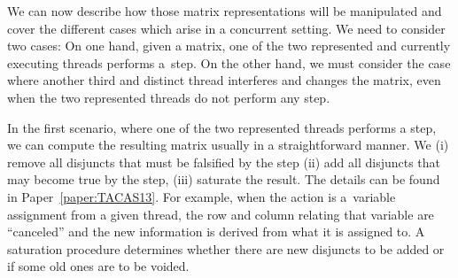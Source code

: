 
%
%
We can now describe how those matrix representations will be
manipulated and cover the different cases which arise in a concurrent
setting.
%
We need to consider two cases: %
On one hand, given a matrix, one of the two represented and currently
executing threads performs a~step.
%
On the other hand, we must consider the case where another third and
distinct thread interferes and changes the matrix, even when the two
represented threads do not perform any step.

In the first scenario, where one of the two represented threads
performs a step, we can compute the resulting matrix usually in a
straightforward manner.
%
We (i) remove all disjuncts that must be falsified by the
step %
(ii) add all disjuncts that may become true by the step, %
(iii) saturate the result.
%
The details can be found in Paper~\ref{paper:TACAS13}.
%
For example, when the action is a~variable assignment from a given
thread, the row and column relating that variable are ``canceled'' and
the new information is derived from what it is assigned to. A
saturation procedure determines whether there are new disjuncts to be
added or if some old ones are to be voided.

